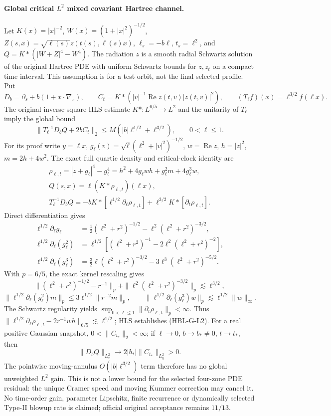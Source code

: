 \paragraph{Global critical \(L^2\) mixed covariant Hartree channel.}
Let \(K(x)=|x|^{-2}\), \(W(x)=(1+|x|^2)^{-1/2}\),
\(Z(s,x)=\sqrt{\ell(s)}z(t(s),\ell(s)x)\),
\(\ell_s=-b\ell\), \(t_s=\ell^2\), and
\(Q=K*(|W+Z|^4-W^4)\). The radiation \(z\) is a smooth
radial Schwartz solution of the original Hartree PDE with
uniform Schwartz bounds for \(z,z_t\) on a compact time interval.
This assumption is for a test orbit, not the final selected profile.
Put
\[
D_b=\partial_s+b(1+x\cdot\nabla_x),\qquad
C_t=K*(|v|^{-1}\operatorname{Re}z(t,v)|z(t,v)|^2),\qquad
(T_\ell f)(x)=\ell^{3/2}f(\ell x).
\]
The original inverse-square HLS estimate \(K*:L^{6/5}\to L^2\)
and the unitarity of \(T_\ell\) imply the global bound
\[
\boxed{
\|T_\ell^{-1}D_bQ+2bC_t\|_2
\le M(|b|\ell^{1/2}+\ell^{3/2}),\qquad0<\ell\le1.
}\tag{HBL-G-L2}
\]
For its proof write \(y=\ell x\),
\(g_\ell(v)=\sqrt\ell(\ell^2+|v|^2)^{-1/2}\),
\(w=\operatorname{Re}z\), \(h=|z|^2\), \(m=2h+4w^2\).
The exact full quartic density and critical-clock identity are
\[
\begin{gathered}
\rho_{\ell,t}=|z+g_\ell|^4-g_\ell^4
 =h^2+4g_\ell wh+g_\ell^2m+4g_\ell^3w,\\
Q(s,x)=\ell(K*\rho_{\ell,t})(\ell x),\\
T_\ell^{-1}D_bQ=-bK*[\ell^{1/2}\partial_\ell\rho_{\ell,t}]
 +\ell^{3/2}K*[\partial_t\rho_{\ell,t}].
\end{gathered}
\]
Direct differentiation gives
\[
\begin{aligned}
\ell^{1/2}\partial_\ell g_\ell
 &=\tfrac12(\ell^2+r^2)^{-1/2}-\ell^2(\ell^2+r^2)^{-3/2},\\
\ell^{1/2}\partial_\ell(g_\ell^2)
 &=\ell^{1/2}[(\ell^2+r^2)^{-1}-2\ell^2(\ell^2+r^2)^{-2}],\\
\ell^{1/2}\partial_\ell(g_\ell^3)
 &=\tfrac32\ell(\ell^2+r^2)^{-3/2}
       -3\ell^3(\ell^2+r^2)^{-5/2}.
\end{aligned}
\]
With \(p=6/5\), the exact kernel rescaling gives
\[
\|(\ell^2+r^2)^{-1/2}-r^{-1}\|_p
+\|\ell^2(\ell^2+r^2)^{-3/2}\|_p\lesssim\ell^{3/2},
\]
\[
\|\ell^{1/2}\partial_\ell(g_\ell^2)m\|_p
 \le3\ell^{1/2}\|r^{-2}m\|_p,\qquad
\|\ell^{1/2}\partial_\ell(g_\ell^3)w\|_p
 \lesssim\ell^{1/2}\|w\|_\infty.
\]
The Schwartz regularity yields
\(\sup_{0<\ell\le1}\|\partial_t\rho_{\ell,t}\|_p<\infty\).
Thus
\(\|\ell^{1/2}\partial_\ell\rho_{\ell,t}
-2r^{-1}wh\|_{6/5}\lesssim\ell^{1/2}\);
HLS establishes (HBL-G-L2).
For a real positive Gaussian snapshot,
\(0<\|C_{t_*}\|_2<\infty\); if \(\ell\to0\),
\(b\to b_*\ne0\), \(t\to t_*\), then
\[
\boxed{\quad\|D_bQ\|_{L^2_x}
\longrightarrow2|b_*|\|C_{t_*}\|_{L^2_y}>0.\quad}
\]
The pointwise moving-annulus \(O(|b|\ell^{3/2})\) term
therefore has no global unweighted \(L^2\) gain.
This is not a lower bound for the selected four-zone PDE residual:
the unique Cramer speed and moving Kummer correction may cancel it.
No time-order gain, parameter Lipschitz, finite recurrence or
dynamically selected Type-II blowup rate is claimed;
official original acceptance remains \(11/13\).
